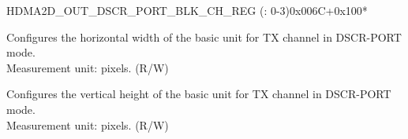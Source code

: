 \begin{register}{H}{DMA2D\_OUT\_DSCR\_PORT\_BLK\_CH\_REG (: 0-3)}{0x006C+0x100*}\label{regdesc:DMA2DOUTDSCRPORTBLKCHNREG}
%
%
%
\regnewline%
\begin{regdesc}\begin{reglist}
\label{fielddesc:DMA2DOUTDSCRPORTBLKHCHN}\item [DMA2D\_OUT\_DSCR\_PORT\_BLK\_H\_CH\regindex{n}] Configures the horizontal width of the basic unit for TX channel  in DSCR-PORT mode.\\ Measurement unit: pixels.  (R/W)
\label{fielddesc:DMA2DOUTDSCRPORTBLKVCHN}\item [DMA2D\_OUT\_DSCR\_PORT\_BLK\_V\_CH\regindex{n}] Configures the vertical height of the basic unit for TX channel  in DSCR-PORT mode.\\ Measurement unit: pixels.  (R/W)
\end{reglist}\end{regdesc}
\end{register}


